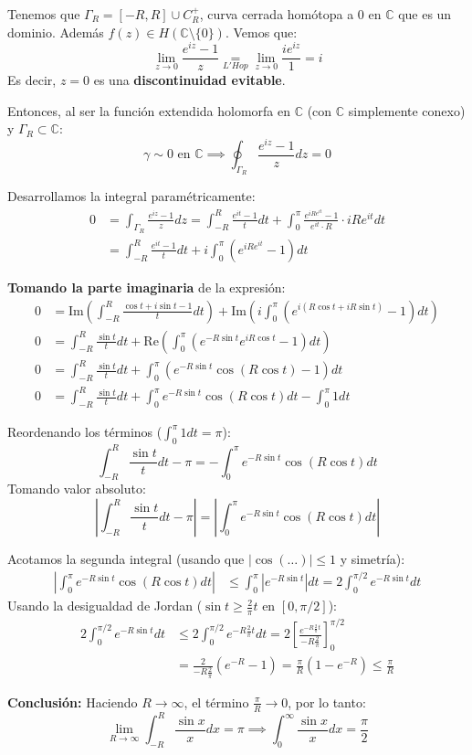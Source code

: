 {

Tenemos que $\Gamma_R = [-R, R] \cup C_R^+$, curva cerrada homótopa a 0 en $\mathbb{C}$ que es un dominio. Además $f(z) \in H(\mathbb{C} \setminus \{0\})$. Vemos que:
\[
\lim_{z \to 0} \frac{e^{iz}-1}{z} \underset{L'Hop}{=} \lim_{z \to 0} \frac{ie^{iz}}{1} = i
\]
Es decir, $z=0$ es una \textbf{discontinuidad evitable}. 

Entonces, al ser la función extendida holomorfa en $\mathbb{C}$ (con $\mathbb{C}$ simplemente conexo) y $\Gamma_R \subset \mathbb{C}$:
\[
\gamma \sim 0 \text{ en } \mathbb{C} \implies \oint_{\Gamma_R} \frac{e^{iz}-1}{z} dz = 0
\]

Desarrollamos la integral paramétricamente:
\begin{align*}
0 &= \int_{\Gamma_R} \frac{e^{iz}-1}{z} dz = \int_{-R}^{R} \frac{e^{it}-1}{t} dt + \int_{0}^{\pi} \frac{e^{iRe^{it}}-1}{e^{it} \cdot R} \cdot i R e^{it} dt \\
  &= \int_{-R}^{R} \frac{e^{it}-1}{t} dt + i \int_{0}^{\pi} (e^{iRe^{it}} - 1) dt
\end{align*}

\textbf{Tomando la parte imaginaria} de la expresión:
\begin{align*}
0 &= \text{Im}\left( \int_{-R}^{R} \frac{\cos t + i\sin t - 1}{t} dt \right) + \text{Im}\left( i \int_{0}^{\pi} (e^{i(R\cos t + iR\sin t)} - 1) dt \right) \\
0 &= \int_{-R}^{R} \frac{\sin t}{t} dt + \text{Re}\left( \int_{0}^{\pi} (e^{-R\sin t} e^{iR\cos t} - 1) dt \right) \\
0 &= \int_{-R}^{R} \frac{\sin t}{t} dt + \int_{0}^{\pi} (e^{-R\sin t} \cos(R\cos t) - 1) dt \\
0 &= \int_{-R}^{R} \frac{\sin t}{t} dt + \int_{0}^{\pi} e^{-R\sin t} \cos(R\cos t) dt - \int_{0}^{\pi} 1 dt
\end{align*}

Reordenando los términos ($\int_0^\pi 1 dt = \pi$):
\[
\int_{-R}^{R} \frac{\sin t}{t} dt - \pi = - \int_{0}^{\pi} e^{-R\sin t} \cos(R\cos t) dt
\]
Tomando valor absoluto:
\[
\left| \int_{-R}^{R} \frac{\sin t}{t} dt - \pi \right| = \left| \int_{0}^{\pi} e^{-R\sin t} \cos(R\cos t) dt \right|
\]

Acotamos la segunda integral (usando que $|\cos(\dots)| \le 1$ y simetría):
\begin{align*}
\left| \int_{0}^{\pi} e^{-R\sin t} \cos(R\cos t) dt \right| &\le \int_{0}^{\pi} |e^{-R\sin t}| dt = 2 \int_{0}^{\pi/2} e^{-R\sin t} dt
\end{align*}
Usando la desigualdad de Jordan ($\sin t \ge \frac{2}{\pi}t$ en $[0, \pi/2]$):
\begin{align*}
2 \int_{0}^{\pi/2} e^{-R\sin t} dt &\le 2 \int_{0}^{\pi/2} e^{-R \frac{2}{\pi} t} dt = 2 \left[ \frac{e^{-R\frac{2}{\pi}t}}{-R\frac{2}{\pi}} \right]_{0}^{\pi/2} \\
&= \frac{2}{-R\frac{2}{\pi}} (e^{-R} - 1) = \frac{\pi}{R} (1 - e^{-R}) \le \frac{\pi}{R}
\end{align*}

\textbf{Conclusión:}
Haciendo $R \to \infty$, el término $\frac{\pi}{R} \to 0$, por lo tanto:
\[
\lim_{R \to \infty} \int_{-R}^{R} \frac{\sin x}{x} dx = \pi \implies \int_{0}^{\infty} \frac{\sin x}{x} dx = \frac{\pi}{2}
\]
}
